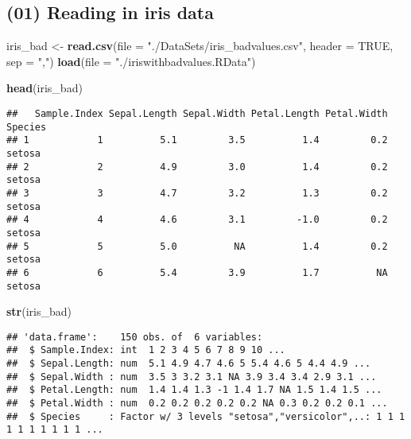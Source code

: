 \documentclass[
]{article}
\newenvironment{Shaded}{\begin{snugshade}}{\end{snugshade}}
\newcommand{\DataTypeTok}[1]{\textcolor[rgb]{0.13,0.29,0.53}{#1}}
\newcommand{\KeywordTok}[1]{\textcolor[rgb]{0.13,0.29,0.53}{\textbf{#1}}}
\newcommand{\NormalTok}[1]{#1}
\newcommand{\OtherTok}[1]{\textcolor[rgb]{0.56,0.35,0.01}{#1}}
\newcommand{\StringTok}[1]{\textcolor[rgb]{0.31,0.60,0.02}{#1}}
\begin{document}
\newpage{}

\hypertarget{reading-in-iris-data}{%
\subsection{(01) Reading in iris data}\label{reading-in-iris-data}}

\begin{Shaded}
\begin{Highlighting}[]
\NormalTok{iris\_bad <{-}}\StringTok{ }\KeywordTok{read.csv}\NormalTok{(}\DataTypeTok{file =} \StringTok{"./DataSets/iris\_badvalues.csv"}\NormalTok{, }\DataTypeTok{header =} \OtherTok{TRUE}\NormalTok{, }\DataTypeTok{sep =} \StringTok{","}\NormalTok{)}
\KeywordTok{load}\NormalTok{(}\DataTypeTok{file =} \StringTok{"./iriswithbadvalues.RData"}\NormalTok{)}

\KeywordTok{head}\NormalTok{(iris\_bad)}
\end{Highlighting}
\end{Shaded}

\begin{verbatim}
##   Sample.Index Sepal.Length Sepal.Width Petal.Length Petal.Width Species
## 1            1          5.1         3.5          1.4         0.2  setosa
## 2            2          4.9         3.0          1.4         0.2  setosa
## 3            3          4.7         3.2          1.3         0.2  setosa
## 4            4          4.6         3.1         -1.0         0.2  setosa
## 5            5          5.0          NA          1.4         0.2  setosa
## 6            6          5.4         3.9          1.7          NA  setosa
\end{verbatim}

\begin{Shaded}
\begin{Highlighting}[]
\KeywordTok{str}\NormalTok{(iris\_bad)}
\end{Highlighting}
\end{Shaded}

\begin{verbatim}
## 'data.frame':    150 obs. of  6 variables:
##  $ Sample.Index: int  1 2 3 4 5 6 7 8 9 10 ...
##  $ Sepal.Length: num  5.1 4.9 4.7 4.6 5 5.4 4.6 5 4.4 4.9 ...
##  $ Sepal.Width : num  3.5 3 3.2 3.1 NA 3.9 3.4 3.4 2.9 3.1 ...
##  $ Petal.Length: num  1.4 1.4 1.3 -1 1.4 1.7 NA 1.5 1.4 1.5 ...
##  $ Petal.Width : num  0.2 0.2 0.2 0.2 0.2 NA 0.3 0.2 0.2 0.1 ...
##  $ Species     : Factor w/ 3 levels "setosa","versicolor",..: 1 1 1 1 1 1 1 1 1 1 ...
\end{verbatim}
\end{document}
